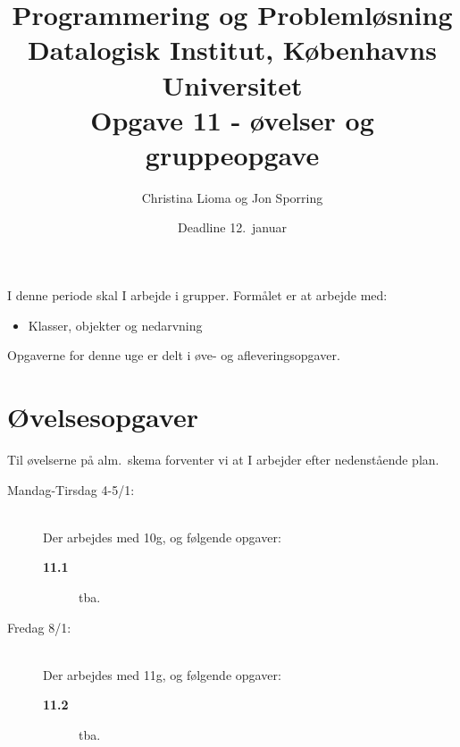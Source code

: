 \documentclass[a4paper,12pt]{article}
\title{Programmering og Problemløsning\\Datalogisk Institut,
  Københavns Universitet\\Opgave 11 - øvelser og  gruppeopgave}
\author{Christina Lioma og Jon Sporring}
\date{Deadline  12.\ januar}
\begin{document}
\maketitle

I denne periode skal I arbejde i grupper. Formålet er at arbejde med:
\begin{itemize}
\item Klasser, objekter og nedarvning
\end{itemize}

Opgaverne for denne uge er delt i øve- og afleveringsopgaver. 

\section*{Øvelsesopgaver}
Til øvelserne på alm.\ skema forventer vi at I arbejder efter nedenstående plan.
\begin{description}
\item[Mandag-Tirsdag 4-5/1:]~\\
  Der arbejdes med 10g, og følgende opgaver:
  \begin{description}
  \item[\textbf{11.1}] tba.
  \end{description}
\item[Fredag 8/1:]~\\
  Der arbejdes med 11g, og følgende opgaver:
  \begin{description}
  \item[\textbf{11.2}] tba.
  \end{description}
\end{description}
\end{document}
